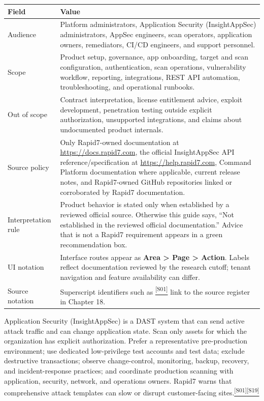 \documentclass[11pt,letterpaper,oneside]{scrreprt}
\newcommand{\src}[1]{\hyperref[src:#1]{\textsuperscript{\color{R7Orange}[#1]}}}
\newcommand{\uipath}[1]{\textsf{\textbf{#1}}}
\begin{document}
\begin{tabularx}{\textwidth}{@{}P{1.55in}Y@{}}
\toprule
\textbf{Field} & \textbf{Value}\\
\midrule
Audience & Platform administrators, Application Security (InsightAppSec) administrators, AppSec engineers, scan operators, application owners, remediators, CI/CD engineers, and support personnel.\\
Scope & Product setup, governance, app onboarding, target and scan configuration, authentication, scan operations, vulnerability workflow, reporting, integrations, REST API automation, troubleshooting, and operational runbooks.\\
Out of scope & Contract interpretation, license entitlement advice, exploit development, penetration testing outside explicit authorization, unsupported integrations, and claims about undocumented product internals.\\
Source policy & Only Rapid7-owned documentation at \url{https://docs.rapid7.com}, the official InsightAppSec API reference/specification at \url{https://help.rapid7.com}, Command Platform documentation where applicable, current release notes, and Rapid7-owned GitHub repositories linked or corroborated by Rapid7 documentation.\\
Interpretation rule & Product behavior is stated only when established by a reviewed official source. Otherwise this guide says, ``Not established in the reviewed official documentation.'' Advice that is not a Rapid7 requirement appears in a green recommendation box.\\
UI notation & Interface routes appear as \uipath{Area > Page > Action}. Labels reflect documentation reviewed by the research cutoff; tenant navigation and feature availability can differ.\\
Source notation & Superscript identifiers such as \src{S01} link to the source register in Chapter 18.\\
\bottomrule
\end{tabularx}

\begin{safetybox}
Application Security (InsightAppSec) is a DAST system that can send active attack traffic and can change application state. Scan only assets for which the organization has explicit authorization. Prefer a representative pre-production environment; use dedicated low-privilege test accounts and test data; exclude destructive transactions; observe change-control, monitoring, backup, recovery, and incident-response practices; and coordinate production scanning with application, security, network, and operations owners. Rapid7 warns that comprehensive attack templates can slow or disrupt customer-facing sites.\src{S01}\src{S19}
\end{safetybox}
\end{document}
